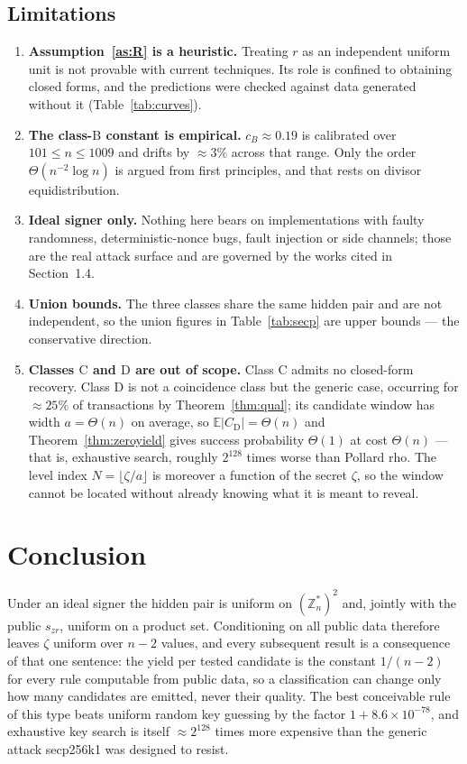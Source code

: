 \documentclass[11pt,a4paper]{article}
\theoremstyle{plain}
\theoremstyle{definition}
\theoremstyle{remark}
\newcommand{\Zs}{\mathbb{Z}_n^{*}}
\newcommand{\Ex}{\mathbb{E}}
\newcommand{\szr}{s_{zr}}
\newcommand{\clB}{\mathrm{B}}
\newcommand{\clC}{\mathrm{C}}
\newcommand{\clD}{\mathrm{D}}
\begin{document}
\subsection{Limitations}

\begin{enumerate}[leftmargin=*,itemsep=3pt]
\item \textbf{Assumption~\ref{as:R} is a heuristic.} Treating $r$ as an independent uniform unit
  is not provable with current techniques. Its role is confined to obtaining closed forms, and the
  predictions were checked against data generated without it (Table~\ref{tab:curves}).
\item \textbf{The class-$\clB$ constant is empirical.} $c_B \approx 0.19$ is calibrated over
  $101 \le n \le 1009$ and drifts by $\approx 3\%$ across that range. Only the order
  $\Theta(n^{-2}\log n)$ is argued from first principles, and that rests on divisor
  equidistribution.
\item \textbf{Ideal signer only.} Nothing here bears on implementations with faulty randomness,
  deterministic-nonce bugs, fault injection or side channels; those are the real attack surface
  and are governed by the works cited in Section~1.4.
\item \textbf{Union bounds.} The three classes share the same hidden pair and are not independent,
  so the union figures in Table~\ref{tab:secp} are upper bounds --- the conservative direction.
\item \textbf{Classes $\clC$ and $\clD$ are out of scope.} Class $\clC$ admits no closed-form
  recovery. Class $\clD$ is not a coincidence class but the generic case, occurring for
  $\approx 25\%$ of transactions by Theorem~\ref{thm:qual}; its candidate window has width
  $a = \Theta(n)$ on average, so $\Ex|C_{\clD}| = \Theta(n)$ and
  Theorem~\ref{thm:zeroyield} gives success probability $\Theta(1)$ at cost $\Theta(n)$ --- that
  is, exhaustive search, roughly $2^{128}$ times worse than Pollard rho. The level index
  $N = \lfloor \zeta/a\rfloor$ is moreover a function of the secret $\zeta$, so the window cannot
  be located without already knowing what it is meant to reveal.
\end{enumerate}

\section{Conclusion}

Under an ideal signer the hidden pair is uniform on $(\Zs)^{2}$ and, jointly with the public
$\szr$, uniform on a product set. Conditioning on all public data therefore leaves $\zeta$ uniform
over $n-2$ values, and every subsequent result is a consequence of that one sentence: the yield
per tested candidate is the constant $1/(n-2)$ for every rule computable from public data, so a
classification can change only how many candidates are emitted, never their quality. The best
conceivable rule of this type beats uniform random key guessing by the factor
$1 + 8.6\times10^{-78}$, and exhaustive key search is itself $\approx 2^{128}$ times more
expensive than the generic attack secp256k1 was designed to resist.
\end{document}
